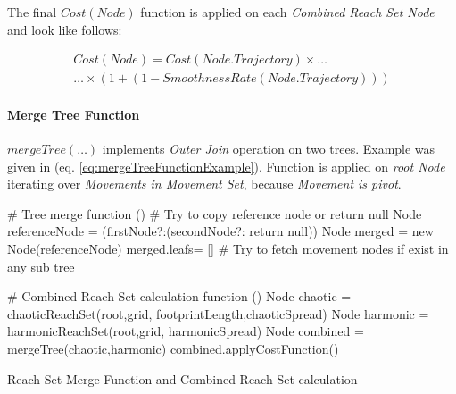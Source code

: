 \newpage\noindent The final $Cost(Node)$ function is applied on each \emph{Combined Reach Set Node} and look like follows:

\begin{multline}
    Cost(Node) = Cost(Node.Trajectory) \times\dots\\\dots\times \left(1+ \left(1-SmoothnessRate(N ode.T rajectory)\right)\right)
\end{multline}

\paragraph{Merge Tree Function} $mergeTree(\dots)$ implements \emph{Outer Join} operation on two trees. Example was given in (eq. \ref{eq:mergeTreeFunctionExample}).
Function is applied on \emph{root Node} iterating over \emph{Movements in Movement Set}, because \emph{Movement is pivot}.

\begin{algorithm}[H]
    
    \BlankLine
    \# Tree merge function\;
    \Fn(){}{
        \BlankLine
        \# Try to copy reference node or return null\;
        Node referenceNode = (firstNode?:(secondNode?: return null))\;
        Node merged =  new Node(referenceNode)\;
        merged.leafs= []\;
        \BlankLine
        \# Try to fetch movement nodes if exist in any sub tree\;
    }{}
    
    \BlankLine
    \# Combined Reach Set calculation function\;
    \Fn(){}{
        Node chaotic = chaoticReachSet(root,grid, footprintLength,chaoticSpread)\;
        Node harmonic = harmonicReachSet(root,grid, harmonicSpread)\;
        Node combined = mergeTree(chaotic,harmonic)\;
        combined.applyCostFunction()\;
    }

    
    \caption{Reach Set Merge Function and Combined Reach Set calculation}
    \label{alg:ReachSetMerge}
\end{algorithm}

